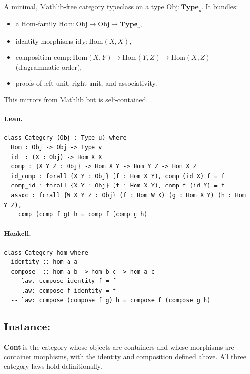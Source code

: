 \documentclass[11pt,a4paper]{article}
\begin{document}
\begin{defn}
A minimal, Mathlib-free category typeclass on a type $\mathrm{Obj} :
\mathbf{Type}_u$.  It bundles:
\begin{itemize}
  \item a $\mathrm{Hom}$-family $\mathrm{Hom} : \mathrm{Obj} \to \mathrm{Obj}
        \to \mathbf{Type}_v$,
  \item identity morphisms $\mathrm{id}_X : \mathrm{Hom}(X, X)$,
  \item composition $\mathrm{comp} : \mathrm{Hom}(X,Y) \to \mathrm{Hom}(Y,Z)
        \to \mathrm{Hom}(X,Z)$ (diagrammatic order),
  \item proofs of left unit, right unit, and associativity.
\end{itemize}
This mirrors  from Mathlib but is self-contained.
\end{defn}

\paragraph{Lean.}
\begin{lstlisting}[style=lean]
class Category (Obj : Type u) where
  Hom : Obj -> Obj -> Type v
  id  : (X : Obj) -> Hom X X
  comp : {X Y Z : Obj} -> Hom X Y -> Hom Y Z -> Hom X Z
  id_comp : forall {X Y : Obj} (f : Hom X Y), comp (id X) f = f
  comp_id : forall {X Y : Obj} (f : Hom X Y), comp f (id Y) = f
  assoc : forall {W X Y Z : Obj} (f : Hom W X) (g : Hom X Y) (h : Hom Y Z),
    comp (comp f g) h = comp f (comp g h)
\end{lstlisting}

\paragraph{Haskell.}
\begin{lstlisting}[style=haskell]
class Category hom where
  identity :: hom a a
  compose  :: hom a b -> hom b c -> hom a c
  -- law: compose identity f = f
  -- law: compose f identity = f
  -- law: compose (compose f g) h = compose f (compose g h)
\end{lstlisting}


\subsection{Instance: }

\begin{defn}
\textbf{Cont} is the category whose objects are containers and whose morphisms
are container morphisms, with the identity and composition defined above.  All
three category laws hold definitionally.
\end{defn}
\end{document}
